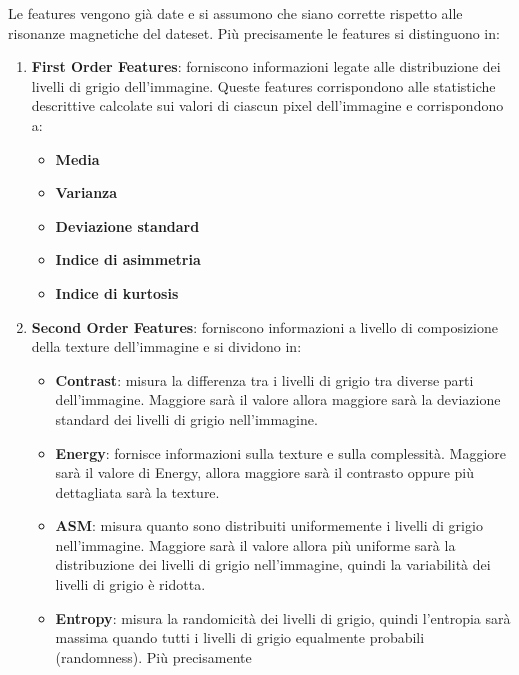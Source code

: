 Le features vengono già date e si assumono che siano corrette rispetto alle 
risonanze magnetiche del dateset\cite{explanation-features}. Più precisamente 
le features si distinguono in:
\begin{enumerate}
      \item \textbf{First Order Features}: forniscono informazioni legate alle
            distribuzione dei livelli di grigio dell'immagine. Queste features
            corrispondono alle statistiche descrittive calcolate sui valori di
            ciascun pixel dell'immagine e corrispondono a:
            \begin{itemize}
                  \item \textbf{Media}
                  \item \textbf{Varianza}
                  \item \textbf{Deviazione standard}
                  \item \textbf{Indice di asimmetria}
                  \item \textbf{Indice di kurtosis}
            \end{itemize}
      \item \textbf{Second Order Features}: forniscono informazioni a livello di
            composizione della texture dell'immagine e si dividono in:
            \begin{itemize}
                  \item \textbf{Contrast}: misura la differenza tra i livelli di 
                  grigio tra diverse parti dell'immagine. Maggiore sarà il valore 
                  allora maggiore sarà la deviazione standard dei livelli di grigio
                  nell'immagine.
                  \item \textbf{Energy}: fornisce informazioni sulla texture e
                  sulla complessità. Maggiore sarà il valore di Energy, allora 
                  maggiore sarà il contrasto oppure più dettagliata sarà la texture.
                  \item \textbf{ASM}: misura quanto sono distribuiti uniformemente i
                  livelli di grigio nell'immagine. Maggiore sarà il valore allora
                  più uniforme sarà la distribuzione dei livelli di grigio nell'immagine,
                  quindi la variabilità dei livelli di grigio è ridotta.
                  \item \textbf{Entropy}: misura la randomicità dei livelli di
                  grigio, quindi l'entropia sarà massima quando tutti i livelli 
                  di grigio equalmente probabili (randomness). Più precisamente

\end{itemize}
\end{enumerate}
